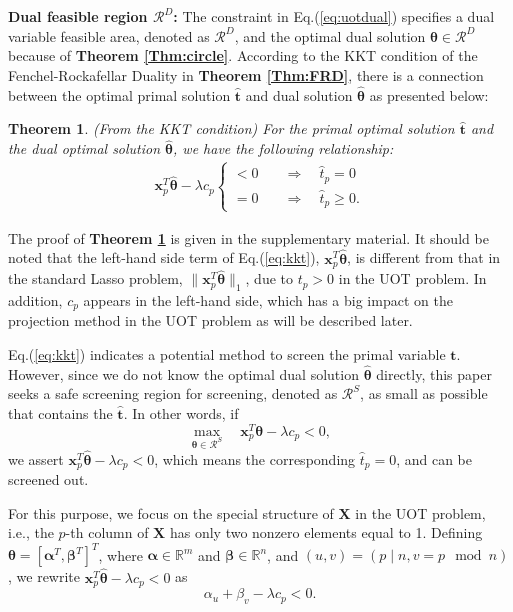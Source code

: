 \documentclass[twoside]{article}
\theoremstyle{plain}
\newtheorem{thm}{Theorem}
\newcommand{\R}{\mathbb{R}}
\newcommand{\mat}[1]{\mathbf{#1}}
\renewcommand{\vec}[1]{\bm{#1}}
\begin{document}
{\bf Dual feasible region $\mathcal{R}^D$:} 
The constraint in Eq.(\ref{eq:uotdual}) specifies a dual variable feasible area, denoted as $\mathcal{R}^{D}$, and the optimal dual solution $\hat{\vec{\theta}} \in \mathcal{R}^{D}$ because of {\bf Theorem \ref{Thm:circle}}.
%
According to the KKT condition of the Fenchel-Rockafellar Duality in {\bf Theorem \ref{Thm:FRD}}, there is a connection between the optimal primal solution $\hat{\vec{t}}$ and dual solution $\hat{\vec{\theta}}$ as presented below:
\begin{thm}(From the KKT condition) For the primal optimal solution $\hat{\vec{t}}$ and the dual optimal solution $\hat{\vec{\theta}}$, we have the following relationship:
\label{Thm:KKT}
 \begin{equation}
 \label{eq:kkt}
\begin{split}
\vec{x}_p^T\hat{\vec{\theta}} -\lambda c_p \left\{
\begin{aligned}
< 0 \quad& \Longrightarrow \quad\hat{t}_p = 0\\
= 0 \quad& \Longrightarrow \quad\hat{t}_p \geq 0.
\end{aligned}
\right.
 \end{split}
\end{equation}
\end{thm}
The proof of {\bf Theorem \ref{Thm:KKT}} is given in the supplementary material. It should be noted that the left-hand side term of Eq.(\ref{eq:kkt}), $\vec{x}_p^T\hat{\vec{\theta}} $, is different from that in the standard Lasso problem, $\|\vec{x}_p^T\hat{\vec{\theta}} \|_1$,  due to $t_p > 0$ in the UOT problem. In addition, $c_p$ appears in the left-hand side, which has a big impact on the projection method in the UOT problem as will be described later. 

Eq.(\ref{eq:kkt}) indicates a potential method to screen the primal variable $\vec{t}$. However, since we do not know the optimal dual solution $\hat{\vec{\theta}}$ directly, this paper seeks a safe screening region for screening, denoted as $\mathcal{R}^{S}$, as small as possible that contains the $\hat{\vec{t}}$. In other words, if
\begin{equation}
\label{eq:kktineq}
\max_{\vec{\theta} \in \mathcal{R}^S}\quad  \vec{x}_p^T\vec{\theta} -\lambda c_p < 0,
\end{equation}
we assert 
$\vec{x}_p^T\hat{\vec{\theta}} -\lambda c_p < 0$,
which means the corresponding $\hat{{t}}_p = 0$, and can be screened out. 

For this purpose, we focus on the special structure of $\mat{X}$ in the UOT problem, i.e., the $p$-th column of $\mat{X}$ has only two nonzero elements equal to 1. Defining $\vec{\theta} = [{\vec{\alpha}}^T,{\vec{\beta}}^T]^T$, where $\vec{\alpha}\in\R^{m}$ and $\vec{\beta}\in\R^{n}$, and $(u,v)=(p \mid n,v= p \mod n)$, we rewrite $\vec{x}_p^T\hat{\vec{\theta}} -\lambda c_p < 0$ as
%
\begin{equation}
\label{eq:kktineq_sep}
\alpha_{u} + \beta_{v}-\lambda c_p < 0.
\end{equation}
\end{document}
